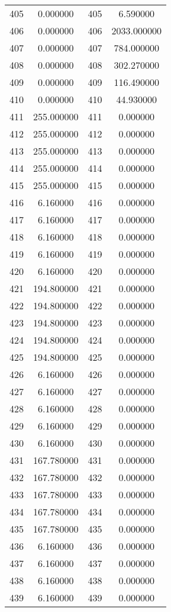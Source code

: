 \documentclass[12pt]{article}
\begin{document}
\begin{longtable}{@{}cccc@{}}
405 & 0.000000 & 405 & 6.590000 \\
406 & 0.000000 & 406 & 2033.000000 \\
407 & 0.000000 & 407 & 784.000000 \\
408 & 0.000000 & 408 & 302.270000 \\
409 & 0.000000 & 409 & 116.490000 \\
410 & 0.000000 & 410 & 44.930000 \\
411 & 255.000000 & 411 & 0.000000 \\
412 & 255.000000 & 412 & 0.000000 \\
413 & 255.000000 & 413 & 0.000000 \\
414 & 255.000000 & 414 & 0.000000 \\
415 & 255.000000 & 415 & 0.000000 \\
416 & 6.160000 & 416 & 0.000000 \\
417 & 6.160000 & 417 & 0.000000 \\
418 & 6.160000 & 418 & 0.000000 \\
419 & 6.160000 & 419 & 0.000000 \\
420 & 6.160000 & 420 & 0.000000 \\
421 & 194.800000 & 421 & 0.000000 \\
422 & 194.800000 & 422 & 0.000000 \\
423 & 194.800000 & 423 & 0.000000 \\
424 & 194.800000 & 424 & 0.000000 \\
425 & 194.800000 & 425 & 0.000000 \\
426 & 6.160000 & 426 & 0.000000 \\
427 & 6.160000 & 427 & 0.000000 \\
428 & 6.160000 & 428 & 0.000000 \\
429 & 6.160000 & 429 & 0.000000 \\
430 & 6.160000 & 430 & 0.000000 \\
431 & 167.780000 & 431 & 0.000000 \\
432 & 167.780000 & 432 & 0.000000 \\
433 & 167.780000 & 433 & 0.000000 \\
434 & 167.780000 & 434 & 0.000000 \\
435 & 167.780000 & 435 & 0.000000 \\
436 & 6.160000 & 436 & 0.000000 \\
437 & 6.160000 & 437 & 0.000000 \\
438 & 6.160000 & 438 & 0.000000 \\
439 & 6.160000 & 439 & 0.000000 \\

\end{longtable}
\end{document}
